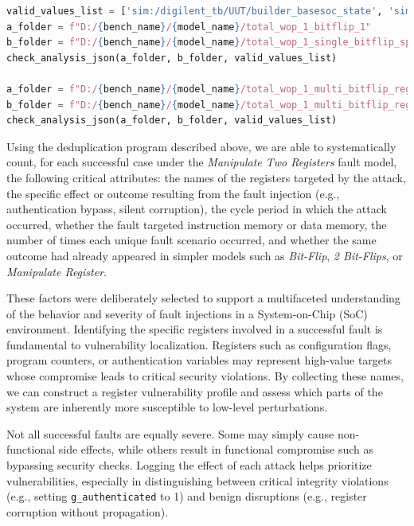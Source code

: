 \begin{lstlisting}[language=python, caption={newfault.py}, label={newfault}]
valid_values_list = ['sim:/digilent_tb/UUT/builder_basesoc_state', 'sim:/digilent_tb/UUT/builder_slave_sel_r', 'sim:/digilent_tb/UUT/main_basesoc_interface0_ram_bus_ack', 'sim:/digilent_tb/UUT/main_basesoc_interface1_ram_bus_ack', 'sim:/digilent_tb/UUT/main_basesoc_ram_bus_ack']
a_folder = f"D:/{bench_name}/{model_name}/total_wop_1_bitflip_1"
b_folder = f"D:/{bench_name}/{model_name}/total_wop_1_single_bitflip_spatial_2"
check_analysis_json(a_folder, b_folder, valid_values_list)

a_folder = f"D:/{bench_name}/{model_name}/total_wop_1_multi_bitflip_reg_2"
b_folder = f"D:/{bench_name}/{model_name}/total_wop_1_multi_bitflip_reg_multi_2"
check_analysis_json(a_folder, b_folder, valid_values_list)
\end{lstlisting}   

Using the deduplication program described above, we are able to systematically count, for each successful case under the \textit{Manipulate Two Registers} fault model, the following critical attributes: the names of the registers targeted by the attack, the specific effect or outcome resulting from the fault injection (e.g., authentication bypass, silent corruption), the cycle period in which the attack occurred, whether the fault targeted instruction memory or data memory, the number of times each unique fault scenario occurred, and whether the same outcome had already appeared in simpler models such as \textit{Bit-Flip}, \textit{2 Bit-Flips}, or \textit{Manipulate Register}.

These factors were deliberately selected to support a multifaceted understanding of the behavior and severity of fault injections in a System-on-Chip (SoC) environment. Identifying the specific registers involved in a successful fault is fundamental to vulnerability localization. Registers such as configuration flags, program counters, or authentication variables may represent high-value targets whose compromise leads to critical security violations. By collecting these names, we can construct a register vulnerability profile and assess which parts of the system are inherently more susceptible to low-level perturbations.

Not all successful faults are equally severe. Some may simply cause non-functional side effects, while others result in functional compromise such as bypassing security checks. Logging the effect of each attack helps prioritize vulnerabilities, especially in distinguishing between critical integrity violations (e.g., setting \texttt{g\_authenticated} to 1) and benign disruptions (e.g., register corruption without propagation).

